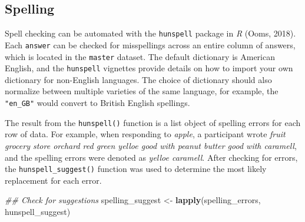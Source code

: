 \documentclass[man]{apa6}
\newenvironment{Shaded}{\begin{snugshade}}{\end{snugshade}}
\newcommand{\CommentTok}[1]{\textcolor[rgb]{0.56,0.35,0.01}{\textit{#1}}}
\newcommand{\DataTypeTok}[1]{\textcolor[rgb]{0.13,0.29,0.53}{#1}}
\newcommand{\KeywordTok}[1]{\textcolor[rgb]{0.13,0.29,0.53}{\textbf{#1}}}
\newcommand{\NormalTok}[1]{#1}
\newcommand{\OperatorTok}[1]{\textcolor[rgb]{0.81,0.36,0.00}{\textbf{#1}}}
\newcommand{\StringTok}[1]{\textcolor[rgb]{0.31,0.60,0.02}{#1}}
\begin{document}
\hypertarget{spelling}{%
\subsection{Spelling}\label{spelling}}

Spell checking can be automated with the \texttt{hunspell} package in \emph{R} (Ooms, 2018). Each \texttt{answer} can be checked for misspellings across an entire column of answers, which is located in the \texttt{master} dataset. The default dictionary is American English, and the \texttt{hunspell} vignettes provide details on how to import your own dictionary for non-English languages. The choice of dictionary should also normalize between multiple varieties of the same language, for example, the \texttt{"en\_GB"} would convert to British English spellings.

\scriptsize

\begin{Shaded}
\end{Shaded}

\normalsize

The result from the \texttt{hunspell()} function is a list object of spelling errors for each row of data. For example, when responding to \emph{apple}, a participant wrote \emph{fruit grocery store orchard red green yelloe good with peanut butter good with caramell}, and the spelling errors were denoted as \emph{yelloe caramell}. After checking for errors, the \texttt{hunspell\_suggest()} function was used to determine the most likely replacement for each error.

\scriptsize

\begin{Shaded}
\begin{Highlighting}[]
\CommentTok{## Check for suggestions}
\NormalTok{spelling_suggest <-}\StringTok{ }\KeywordTok{lapply}\NormalTok{(spelling_errors, hunspell_suggest)}
\end{Highlighting}
\end{Shaded}
\end{document}
